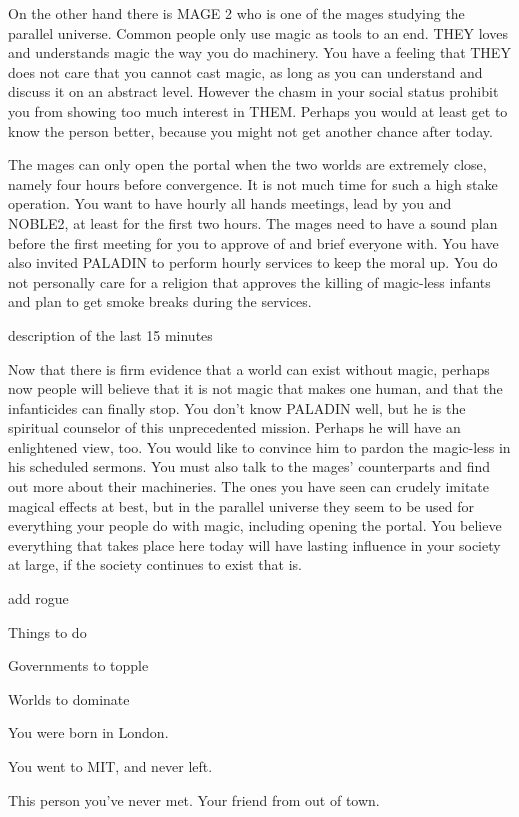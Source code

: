 \documentclass[char]{guildcamp3}
\begin{document}
On the other hand there is MAGE 2 who is one of the mages studying the parallel universe. Common people only use magic as tools to an end. THEY loves and understands magic the way you do machinery. You have a feeling that THEY does not care that you cannot cast magic, as long as you can understand and discuss it on an abstract level. However the chasm in your social status prohibit you from showing too much interest in THEM. Perhaps you would at least get to know the person better, because you might not get another chance after today.

The mages can only open the portal when the two worlds are extremely close, namely four hours before convergence. It is not much time for such a high stake operation. You want to have hourly all hands meetings, lead by you and NOBLE2, at least for the first two hours. The mages need to have a sound plan before the first meeting for you to approve of and brief everyone with. You have also invited PALADIN to perform hourly services to keep the moral up. You do not personally care for a religion that approves the killing of magic-less infants and plan to get smoke breaks during the services.

description of the last 15 minutes 

Now that there is firm evidence that a world can exist without magic, perhaps now people will believe that it is not magic that makes one human, and that the infanticides can finally stop. You don't know PALADIN well, but he is the spiritual counselor of this unprecedented mission. Perhaps he will have an enlightened view, too. You would like to convince him to pardon the magic-less in his scheduled sermons. You must also talk to the mages' counterparts and find out more about their machineries. The ones you have seen can crudely imitate magical effects at best, but in the parallel universe they seem to be used for everything your people do with magic, including opening the portal. You believe everything that takes place here today will have lasting influence in your society at large, if the society continues to exist that is.

add rogue

\begin{itemz}[Goals]
  \item Things to do
  \item Governments to topple
  \item Worlds to dominate
\end{itemz}

\begin{itemz}[Notes]
  \item You were born in London.
  \item You went to MIT, and never left.
\end{itemz}


\begin{contacts}
  \contact{\cNPC{}} This person you've never met.
  \contact{\cSomeGuy{}} Your friend from out of town.
\end{contacts}
\end{document}
